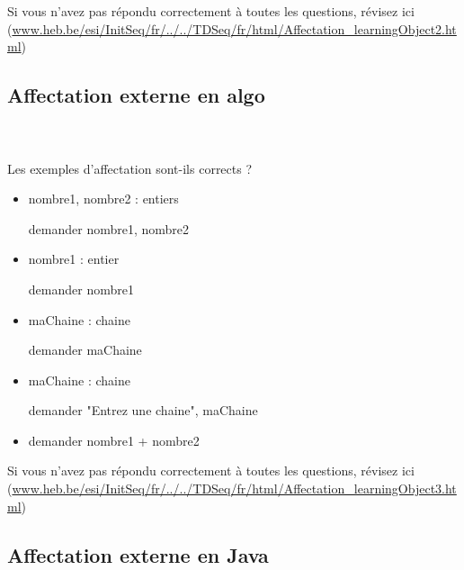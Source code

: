 \documentclass[11pt,a4paper]{article}
\begin{document}
        Si vous n'avez pas r\'epondu correctement \`a toutes les questions, 
        r\'evisez ici (\url{www.heb.be/esi/InitSeq/fr/../../TDSeq/fr/html/Affectation\_learningObject2.html})
            \par
        \subsection{Affectation externe en algo}
			
		\subparagraph{} 
		
                \textcolor{white}{.} \par
            Les exemples d'affectation sont-ils corrects ?
						
            \begin{itemize} 
        
            \item[ \ding{"6F} ] nombre1, nombre2 : entiers \par
				
						demander nombre1, nombre2
        
            \item[ \ding{"6F} ] nombre1 : entier \par
				
						demander nombre1
        
            \item[ \ding{"6F} ] maChaine : chaine \par
				
						demander maChaine
        
            \item[ \ding{"6F} ] maChaine : chaine \par
				
						demander "Entrez une chaine", maChaine
        
            \item[ \ding{"6F} ] demander nombre1 + nombre2
        
            \end{itemize} 
        Si vous n'avez pas r\'epondu correctement \`a toutes les questions, 
        r\'evisez ici (\url{www.heb.be/esi/InitSeq/fr/../../TDSeq/fr/html/Affectation\_learningObject3.html})
            \par
        \subsection{Affectation externe en Java}
			
\end{document}
